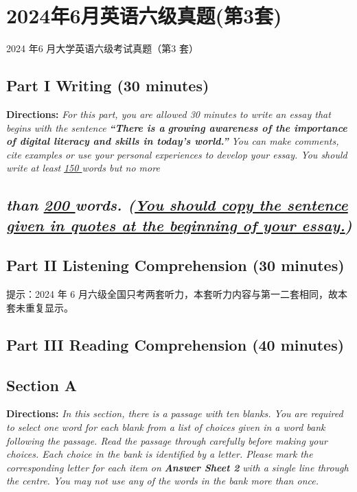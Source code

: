 \documentclass[UTF8,11pt]{ctexart}
\begin{document}
\section*{2024年6月英语六级真题(第3套)}
2024 年6 月大学英语六级考试真题（第3 套）


\subsection*{\textbf{Part I Writing} \textbf{(30 minutes)}}


\textbf{Directions:}\textit{ For this part, you are allowed 30 minutes to write an essay that begins with the sentence }\textbf{\textit{“There is a}} \textbf{\textit{growing awareness of the importance of digital literacy and skills in today’s world.”}}\textit{ You can make comments, cite} \textit{examples or use your personal experiences to develop your essay. You should write at least }\textit{\uline{150 }}\textit{words but no more}


\subsection*{\textit{than }\textit{\uline{200 }}\textit{words. (}\textbf{\textit{\uline{You should copy the sentence given in quotes at the beginning of your essay.}}}\textit{)}}


\subsection*{\textbf{Part II} \textbf{Listening Comprehension} \textbf{(30 minutes)}}


提示：2024 年 6 月六级全国只考两套听力，本套听力内容与第一二套相同，故本套未重复显示。


\subsection*{\textbf{Part III Reading Comprehension (40 minutes)}}


\subsection*{\textbf{Section A}}


\textbf{Directions:} \textit{In this section, there is a passage with ten blanks. You are required to select one word for each blank} \textit{from a list of choices given in a word bank following the passage. Read the passage through carefully before making} \textit{your choices. Each choice in the bank is identified by a letter. Please mark the corresponding letter for each item on} \textbf{\textit{Answer Sheet 2}}\textit{ with a single line through the centre. You may not use any of the words in the bank more than once.}
\end{document}
